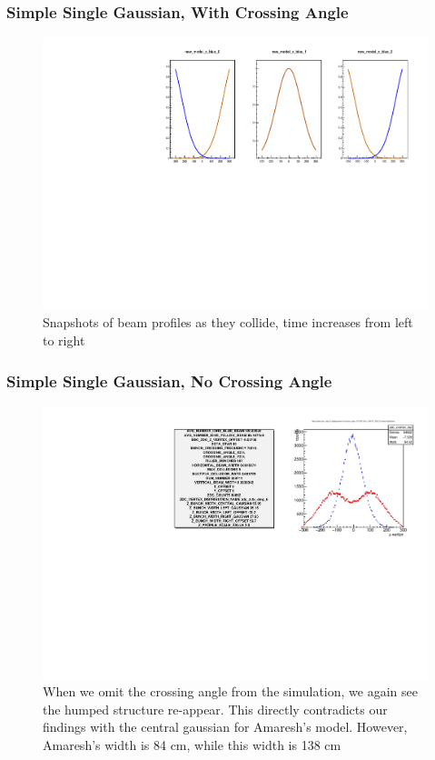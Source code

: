 \begin{frame}
\frametitle{Simple Single Gaussian, With Crossing Angle}
\begin{figure}
\begin{center}
\includegraphics[width=\linewidth]{../OverlapTest/figs/359711_model3_angle_zprofile.pdf}
\end{center}
\caption{Snapshots of beam profiles as they collide, time increases from left to right }
\label{fig:359711_model3_angle_zprofile}
\end{figure}
\end{frame}


\begin{frame}
\frametitle{Simple Single Gaussian, No Crossing Angle}
\begin{figure}
\begin{center}
\includegraphics[width=\linewidth]{../OverlapTest/figs/359711_model3_noangle_vertex.pdf}
\end{center}
\caption{When we omit the crossing angle from the simulation, we again see the
humped structure re-appear. This directly contradicts our findings with the
central gaussian for Amaresh's model. However, Amaresh's width is 84 cm, while
this width is 138 cm}
\label{fig:359711_model3_noangle_vertex}
\end{figure}
\end{frame}


